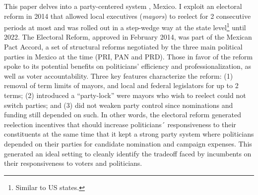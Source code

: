 \documentclass[12pt]{amsart}
\numberwithin{equation}{section}
\theoremstyle{definition}
\theoremstyle{definition}
\theoremstyle{definition}
\begin{document}
This paper delves into a party-centered system%
, Mexico. I exploit an electoral reform in 2014 that allowed local executives (\emph{mayors}) to reelect for 2 consecutive periods at most and was rolled out in a step-wedge way at the state level\footnote{Similar to US states.} until 2022. The Electoral Reform, approved in February 2014, was part of the Mexican Pact Accord, a set of structural reforms negotiated by the three main political parties in Mexico at the time (PRI, PAN and PRD). Those in favor of the reform spoke to its potential benefits on politicians' efficiency and professionalization, as well as voter accountability. Three key features characterize the reform: (1) removal of term limits of mayors, and local and federal legislators for up to 2 terms; (2) introduced a ``party-lock'' were mayors who wish to reelect could not switch parties; and (3) did not weaken party control since nominations and funding still depended on such. In other words, the electoral reform generated reelection incentives that should increase politicians´ responsiveness to their constituents at the same time that it kept a strong party system where politicians depended on their parties for candidate nomination and campaign expenses. This generated an ideal setting to cleanly identify the tradeoff faced by incumbents on their responsiveness to voters and politicians. 
\end{document}
